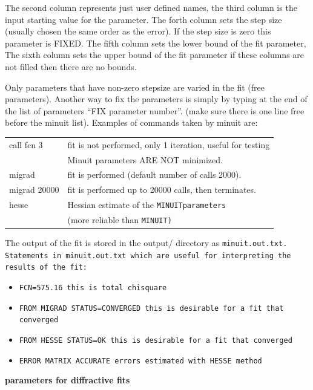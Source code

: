 \begin{description}
The second column represents just user defined names,
the third column is  the input starting value for the parameter.
The forth column sets the step size (usually chosen the same order as the error).
If the step size is zero this parameter is FIXED.
The fifth column sets the lower bound of the fit parameter, 
The sixth column sets the upper bound of the fit parameter
if these columns are not filled then there are no bounds.

Only parameters that have non-zero stepsize are varied 
in the fit (free parameters). Another way to fix the parameters is
simply by typing at the end of the list of parameters ``FIX parameter number''.  
(make sure there is one line free before the minuit list).
Examples of commands taken by minuit are:\\

\begin{tabular}{ll}
call fcn 3  &   fit is not performed, only 1 iteration, useful for testing\\
            &    Minuit parameters ARE NOT minimized. \\
migrad       & fit is performed (default number of calls 2000).\\
migrad 20000 & fit is performed up to 20000 calls, then terminates.\\
hesse        & Hessian estimate of the \tt{MINUIT}\rm parameters \\
& (more reliable than \tt{MINUIT}\rm)\\
\end{tabular}


The output of the fit is stored in the output/ directory as \tt{minuit.out.txt}\rm.
Statements in minuit.out.txt which are useful for interpreting the results of the fit:
\begin{itemize}
\item \tt{FCN=575.16}\rm  \; this is total chisquare
\item \tt{FROM MIGRAD   STATUS=CONVERGED}\rm \; this is desirable for a fit that converged
\item \tt{FROM HESSE     STATUS=OK}\rm       \; this is desirable for a fit that converged 
\item \tt{ERROR MATRIX ACCURATE}   \rm       \; errors estimated with HESSE method
\end{itemize}

{\bf \fitter parameters for diffractive fits} \\
\label{sec:HFitterPar}


\end{description}
